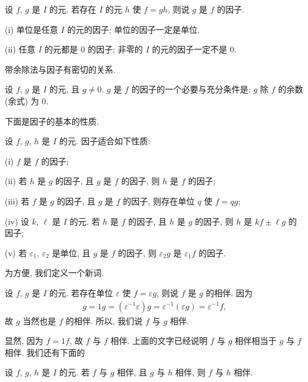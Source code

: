 \begin{definition}
    设 $f$, $g$ 是 $I$ 的元. 若存在 $I$ 的元 $h$ 使 $f=gh$, 则说 $g$ 是 $f$ 的因子.
\end{definition}

\begin{proposition}
    (i) 单位是任意 $I$ 的元的因子; 单位的因子一定是单位.

    (ii) 任意 $I$ 的元都是 $0$ 的因子; 非零的 $I$ 的元的因子一定不是 $0$.
\end{proposition}

带余除法与因子有密切的关系.

\begin{proposition}
    设 $f$, $g$ 是 $I$ 的元, 且 $g \neq 0$. $g$ 是 $f$ 的因子的一个必要与充分条件是: $g$ 除 $f$ 的余数 (余式) 为 $0$.
\end{proposition}

下面是因子的基本的性质.

\begin{proposition}
    设 $f$, $g$, $h$ 是 $I$ 的元. 因子适合如下性质:

    (i) $f$ 是 $f$ 的因子;

    (ii) 若 $h$ 是 $g$ 的因子, 且 $g$ 是 $f$ 的因子, 则 $h$ 是 $f$ 的因子;

    (iii) 若 $f$ 是 $g$ 的因子, 且 $g$ 是 $f$ 的因子, 则存在单位 $q$ 使 $f = qg$;

    (iv) 设 $k$, $\ell$ 是 $I$ 的元. 若 $h$ 是 $f$ 的因子, 且 $h$ 是 $g$ 的因子, 则 $h$ 是 $kf \pm \ell g$ 的因子;

    (v) 若 $\varepsilon_1$, $\varepsilon_2$ 是单位, 且 $g$ 是 $f$ 的因子, 则 $\varepsilon_2 g$ 是 $\varepsilon_1 f$ 的因子.
\end{proposition}

为方便, 我们定义一个新词.

\begin{definition}
    设 $f$, $g$ 是 $I$ 的元. 若存在单位 $\varepsilon$ 使 $f = \varepsilon g$, 则说 $f$ 是 $g$ 的相伴. 因为
    \begin{align*}
        g = 1g = (\varepsilon^{-1} \varepsilon) g = \varepsilon^{-1} (\varepsilon g) = \varepsilon^{-1} f,
    \end{align*}
    故 $g$ 当然也是 $f$ 的相伴. 所以, 我们说 $f$ 与 $g$ 相伴.
\end{definition}

显然, 因为 $f = 1f$, 故 $f$ 与 $f$ 相伴. 上面的文字已经说明 $f$ 与 $g$ 相伴相当于 $g$ 与 $f$ 相伴. 我们还有下面的
\begin{proposition}
    设 $f$, $g$, $h$ 是 $I$ 的元. 若 $f$ 与 $g$ 相伴, 且 $g$ 与 $h$ 相伴, 则 $f$ 与 $h$ 相伴.
\end{proposition}

